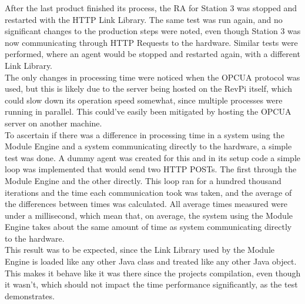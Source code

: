 After the last product finished its process, the \acrlong{RA} for Station 3 was stopped and restarted with the \acrshort{HTTP} Link Library. The same test was run again, and no significant changes to the production steps were noted, even though Station 3 was now communicating through \acrshort{HTTP} Requests to the hardware. Similar tests were performed, where an agent would be stopped and restarted again, with a different Link Library.\\

The only changes in processing time were noticed when the \acrshort{OPCUA} protocol was used, but this is likely due to the server being hosted on the RevPi itself, which could slow down its operation speed somewhat, since multiple processes were running in parallel. This could've easily been mitigated by hosting the \acrshort{OPCUA} server on another machine.\\

To ascertain if there was a difference in processing time in a system using the Module Engine and a system communicating directly to the hardware, a simple test was done. A dummy agent was created for this and in its setup code a simple loop was implemented that would send two \acrshort{HTTP} POSTs. The first through the Module Engine and the other directly. This loop ran for a hundred thousand iterations and the time each communication took was taken, and the average of the differences between times was calculated. All average times measured were under a millisecond, which mean that, on average, the system using the Module Engine takes about the same amount of time as system communicating directly to the hardware.\\

This result was to be expected, since the Link Library used by the Module Engine is loaded like any other Java class and treated like any other Java object. This makes it behave like it was there since the projects compilation, even though it wasn't, which should not impact the time performance significantly, as the test demonstrates.\\